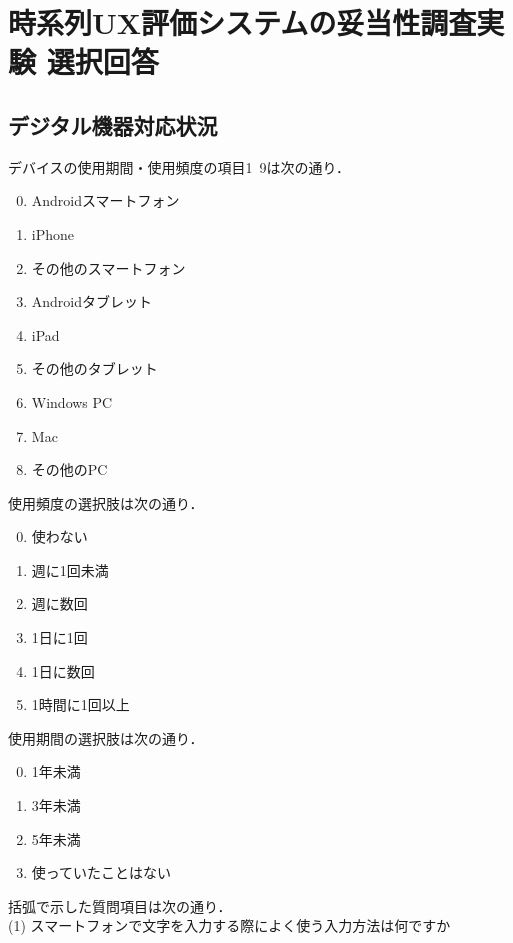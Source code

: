 \chapter{時系列UX評価システムの妥当性調査実験 選択回答}

\section{デジタル機器対応状況}

デバイスの使用期間・使用頻度の項目1~9は次の通り．

\begin{enumerate}
\setcounter{enumi}{-1}
  \item Androidスマートフォン
  \item iPhone
  \item その他のスマートフォン
  \item Androidタブレット
  \item iPad
  \item その他のタブレット
  \item Windows PC
  \item Mac
  \item その他のPC
\end{enumerate}

使用頻度の選択肢は次の通り．

\begin{enumerate}
\setcounter{enumi}{-1}
  \item 使わない
  \item 週に1回未満
  \item 週に数回
  \item 1日に1回
  \item 1日に数回
  \item 1時間に1回以上
\end{enumerate}

使用期間の選択肢は次の通り．

\begin{enumerate}
\setcounter{enumi}{-1}
  \item 1年未満
  \item 3年未満
  \item 5年未満
  \item 使っていたことはない
\end{enumerate}

括弧で示した質問項目は次の通り．\\

(1) スマートフォンで文字を入力する際によく使う入力方法は何ですか\\

